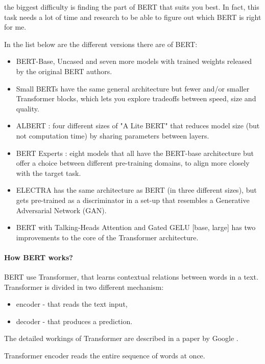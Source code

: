 the biggest difficulty is finding the part of BERT that suits you best.
In fact, this task needs a lot of time and research to be able to figure out which BERT is right for me.

In the list below are the different versions there are of BERT:

\begin{itemize}
    \item BERT-Base, Uncased and seven more models with trained weights released by the original BERT authors.
    \item Small BERTs have the same general architecture but fewer and/or smaller Transformer blocks, which lets you explore tradeoffs between speed, size and quality.
    \item ALBERT \cite{lan_albert_2020}: four different sizes of "A Lite BERT" that reduces model size (but not computation time) by sharing parameters between layers.
    \item BERT Experts \cite{smit_chexbert_2020}: eight models that all have the BERT-base architecture but offer a choice between different pre-training domains, to align more closely with the target task.
    \item ELECTRA \cite{clark_electra_2020} has the same architecture as BERT (in three different sizes), but gets pre-trained as a discriminator in a set-up that resembles a Generative Adversarial Network (GAN).
    \item BERT with Talking-Heads Attention \cite{shazeer_talking-heads_2020} and Gated GELU \cite{shazeer_glu_2020} [base, large] has two improvements to the core of the Transformer architecture.
\end{itemize}
    
\paragraph{How BERT works?} BERT use Transformer, that learns contextual relations between words in a text.
Transformer is divided in two different mechanism:
\begin{itemize}
    \item encoder - that reads the text input,
    \item decoder - that produces a prediction.
\end{itemize}
The detailed workings of Transformer are described in a paper by Google \cite{vaswani_attention_2017}.

Transformer encoder reads the entire sequence of words at once. 

